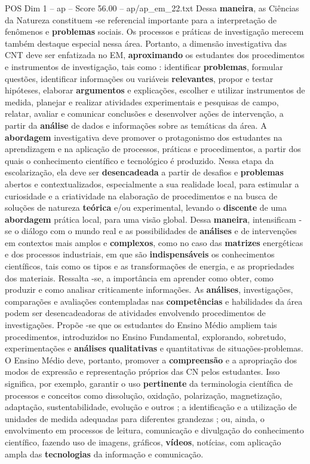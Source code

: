 \begin{textsample}{POS Dim 1 – ap – Score 56.00 – ap/ap\_em\_22.txt}
Dessa \textbf{maneira}, as Ciências da Natureza constituem -se referencial importante para a interpretação de fenômenos e \textbf{problemas} sociais.
Os processos e práticas de investigação merecem também destaque especial nessa área.
Portanto, a dimensão investigativa das CNT deve ser enfatizada no EM, \textbf{aproximando} os estudantes dos procedimentos e instrumentos de investigação, tais como : identificar \textbf{problemas}, formular questões, identificar informações ou variáveis \textbf{relevantes}, propor e testar hipóteses, elaborar \textbf{argumentos} e explicações, escolher e utilizar instrumentos de medida, planejar e realizar atividades experimentais e pesquisas de campo, relatar, avaliar e comunicar conclusões e desenvolver ações de intervenção, a partir da \textbf{análise} de dados e informações sobre as temáticas da área.
A \textbf{abordagem} investigativa deve promover o protagonismo dos estudantes na aprendizagem e na aplicação de processos, práticas e procedimentos, a partir dos quais o conhecimento científico e tecnológico é produzido.
Nessa etapa da escolarização, ela deve ser \textbf{desencadeada} a partir de desafios e \textbf{problemas} abertos e contextualizados, especialmente a sua realidade local, para estimular a curiosidade e a criatividade na elaboração de procedimentos e na busca de soluções de natureza \textbf{teórica} e/ou experimental, levando o \textbf{discente} de uma \textbf{abordagem} prática local, para uma visão global.
Dessa \textbf{maneira}, intensificam -se o diálogo com o mundo real e as possibilidades de \textbf{análises} e de intervenções em contextos mais amplos e \textbf{complexos}, como no caso das \textbf{matrizes} energéticas e dos processos industriais, em que são \textbf{indispensáveis} os conhecimentos científicos, tais como os tipos e as transformações de energia, e as propriedades dos materiais.
Ressalta -se, a importância em aprender como obter, como produzir e como analisar criticamente informações.
As \textbf{análises}, investigações, comparações e avaliações contempladas nas \textbf{competências} e habilidades da área podem ser desencadeadoras de atividades envolvendo procedimentos de investigações.
Propõe -se que os estudantes do Ensino Médio ampliem tais procedimentos, introduzidos no Ensino Fundamental, explorando, sobretudo, experimentações e \textbf{análises} \textbf{qualitativas} e quantitativas de situações-problemas.
O Ensino Médio deve, portanto, promover a \textbf{compreensão} e a apropriação dos modos de expressão e representação próprios das CN pelos estudantes.
Isso significa, por exemplo, garantir o uso \textbf{pertinente} da terminologia científica de processos e conceitos como dissolução, oxidação, polarização, magnetização, adaptação, sustentabilidade, evolução e outros ; a identificação e a utilização de unidades de medida adequadas para diferentes grandezas ; ou, ainda, o envolvimento em processos de leitura, comunicação e divulgação do conhecimento científico, fazendo uso de imagens, gráficos, \textbf{vídeos}, notícias, com aplicação ampla das \textbf{tecnologias} da informação e comunicação.

\end{textsample}
